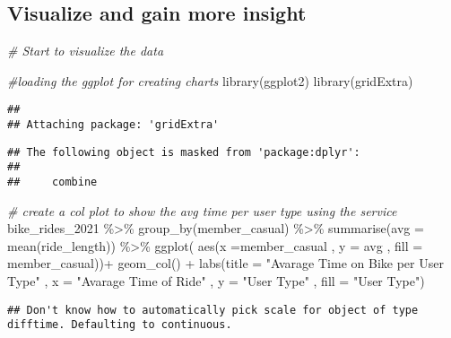 \documentclass[
]{article}
\newenvironment{Shaded}{\begin{snugshade}}{\end{snugshade}}
\newcommand{\AttributeTok}[1]{\textcolor[rgb]{0.77,0.63,0.00}{#1}}
\newcommand{\CommentTok}[1]{\textcolor[rgb]{0.56,0.35,0.01}{\textit{#1}}}
\newcommand{\FunctionTok}[1]{\textcolor[rgb]{0.00,0.00,0.00}{#1}}
\newcommand{\NormalTok}[1]{#1}
\newcommand{\SpecialCharTok}[1]{\textcolor[rgb]{0.00,0.00,0.00}{#1}}
\newcommand{\StringTok}[1]{\textcolor[rgb]{0.31,0.60,0.02}{#1}}
\begin{document}
\hypertarget{visualize-and-gain-more-insight}{%
\subsection{Visualize and gain more
insight}\label{visualize-and-gain-more-insight}}

\begin{Shaded}
\begin{Highlighting}[]
\CommentTok{\# Start to visualize the data }

\CommentTok{\#loading the ggplot for creating charts }
\FunctionTok{library}\NormalTok{(ggplot2)}
\FunctionTok{library}\NormalTok{(gridExtra)}
\end{Highlighting}
\end{Shaded}

\begin{verbatim}
## 
## Attaching package: 'gridExtra'
\end{verbatim}

\begin{verbatim}
## The following object is masked from 'package:dplyr':
## 
##     combine
\end{verbatim}

\begin{Shaded}
\begin{Highlighting}[]
\CommentTok{\# create a col plot to show the avg time per user type using the service }
\NormalTok{bike\_rides\_2021 }\SpecialCharTok{\%\textgreater{}\%} \FunctionTok{group\_by}\NormalTok{(member\_casual) }\SpecialCharTok{\%\textgreater{}\%} \FunctionTok{summarise}\NormalTok{(}\AttributeTok{avg =} \FunctionTok{mean}\NormalTok{(ride\_length)) }\SpecialCharTok{\%\textgreater{}\%}
  \FunctionTok{ggplot}\NormalTok{( }\FunctionTok{aes}\NormalTok{(}\AttributeTok{x =}\NormalTok{member\_casual , }\AttributeTok{y =}\NormalTok{ avg  , }\AttributeTok{fill =}\NormalTok{ member\_casual))}\SpecialCharTok{+}
  \FunctionTok{geom\_col}\NormalTok{() }\SpecialCharTok{+}
  \FunctionTok{labs}\NormalTok{(}\AttributeTok{title =} \StringTok{"Avarage Time on Bike per User Type"}\NormalTok{  , }\AttributeTok{x =} \StringTok{"Avarage Time of Ride"}\NormalTok{ , }\AttributeTok{y =} \StringTok{"User Type"}\NormalTok{ , }\AttributeTok{fill =} \StringTok{"User Type"}\NormalTok{)}
\end{Highlighting}
\end{Shaded}

\begin{verbatim}
## Don't know how to automatically pick scale for object of type difftime. Defaulting to continuous.
\end{verbatim}
\end{document}

